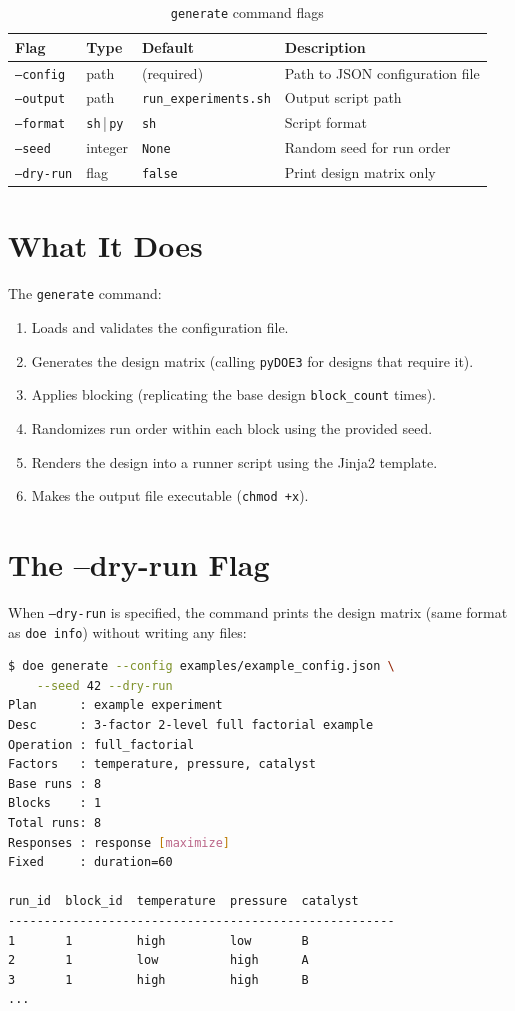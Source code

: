 \documentclass[11pt]{book}
\begin{document}
\begin{table}[H]
\centering
\caption{\texttt{generate} command flags}
\begin{tabular}{@{}lllp{4.5cm}@{}}
\toprule
\textbf{Flag} & \textbf{Type} & \textbf{Default} & \textbf{Description} \\
\midrule
\texttt{--config} & path & (required) & Path to JSON configuration file \\
\texttt{--output} & path & \texttt{run\_experiments.sh} & Output script path \\
\texttt{--format} & \texttt{sh}\,|\,\texttt{py} & \texttt{sh} & Script format \\
\texttt{--seed}   & integer & \texttt{None} & Random seed for run order \\
\texttt{--dry-run} & flag & \texttt{false} & Print design matrix only \\
\bottomrule
\end{tabular}
\end{table}

\section{What It Does}

The \texttt{generate} command:
\begin{enumerate}
  \item Loads and validates the configuration file.
  \item Generates the design matrix (calling \texttt{pyDOE3} for designs that require it).
  \item Applies blocking (replicating the base design \texttt{block\_count} times).
  \item Randomizes run order within each block using the provided seed.
  \item Renders the design into a runner script using the Jinja2 template.
  \item Makes the output file executable (\texttt{chmod +x}).
\end{enumerate}

\section{The --dry-run Flag}

When \texttt{--dry-run} is specified, the command prints the design matrix (same format as \texttt{doe info}) without writing any files:

\begin{lstlisting}[language=bash]
$ doe generate --config examples/example_config.json \
    --seed 42 --dry-run
Plan      : example experiment
Desc      : 3-factor 2-level full factorial example
Operation : full_factorial
Factors   : temperature, pressure, catalyst
Base runs : 8
Blocks    : 1
Total runs: 8
Responses : response [maximize]
Fixed     : duration=60

run_id  block_id  temperature  pressure  catalyst
------------------------------------------------------
1       1         high         low       B
2       1         low          high      A
3       1         high         high      B
...
\end{lstlisting}
\end{document}
